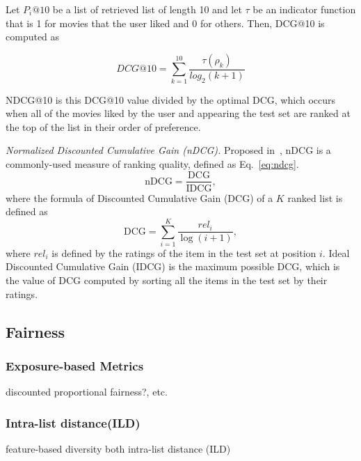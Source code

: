         Let $P_i@10$ be a list of retrieved list of length 10 and let $\tau$ be an indicator function that is 1 for movies that the user liked and 0 for others. Then, DCG@10 is computed as
        
        \begin{equation}
        DCG@10 = \sum_{k=1}^{10}{\frac{\tau(\rho_k)}{log_2(k+1)}}
        \end{equation}
        
        NDCG@10 is this DCG@10 value divided by the optimal DCG, which occurs when all of the movies liked by the user and appearing the test set are ranked at the top of the list in their order of preference.
        
        \textit{Normalized Discounted Cumulative Gain (nDCG).}
        Proposed in~\cite{jarvelin2002cumulated}, nDCG is a commonly-used measure of ranking quality, defined as Eq.~\eqref{eq:ndcg}.
        \begin{equation}
        \text{nDCG}=\frac{\text{DCG}}{\text{IDCG}},
        \label{eq:ndcg}
        \end{equation}
        where the formula of Discounted Cumulative Gain (DCG) of a $K$ ranked list is defined as
        \begin{equation}
        \text{DCG}=\sum_{i=1}^K\frac{{rel}_i}{\log(i+1)},
        \end{equation}
        where ${rel}_i$ is defined by the ratings of the item in the test set at position $i$. Ideal Discounted Cumulative Gain (IDCG) is the maximum possible DCG, which is the value of DCG computed by sorting all the items in the test set by their ratings.
        
    
    \subsection{Fairness}
        \subsubsection{Exposure-based Metrics}
        discounted proportional fairness?, etc.
        
        \subsubsection{Intra-list distance(ILD)}
        feature-based diversity both intra-list distance (ILD) 
        
